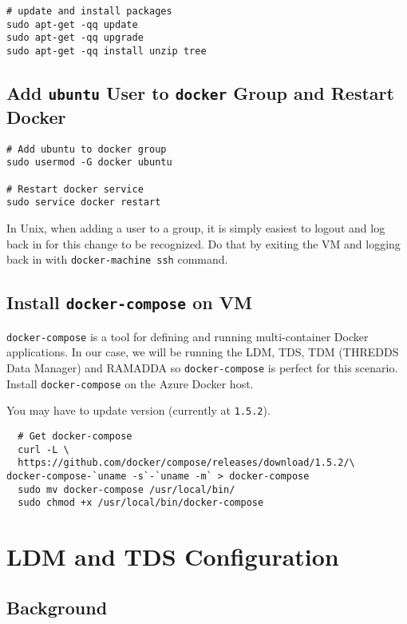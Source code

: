 \documentclass[onecolumn,9pt]{article}
\begin{document}
\begin{verbatim}
# update and install packages
sudo apt-get -qq update
sudo apt-get -qq upgrade
sudo apt-get -qq install unzip tree
\end{verbatim}

\subsection{\label{orgtarget6}Add \texttt{ubuntu} User to \texttt{docker} Group and Restart Docker}
\label{sec:orgheadline11}

\begin{verbatim}
# Add ubuntu to docker group
sudo usermod -G docker ubuntu

# Restart docker service
sudo service docker restart
\end{verbatim}


In Unix, when adding a user to a group, it is simply easiest to logout and log back in for this change to be recognized. Do that by exiting the VM and logging back in with \texttt{docker-machine ssh} command.

\subsection{Install \texttt{docker-compose} on VM}
\label{sec:orgheadline12}

\texttt{docker-compose} is a tool for defining and running multi-container Docker applications. In our case, we will be running the LDM, TDS, TDM (THREDDS Data Manager) and RAMADDA so \texttt{docker-compose} is perfect for this scenario. Install \texttt{docker-compose} on the Azure Docker host.

You may have to update version (currently at \texttt{1.5.2}).

\begin{verbatim}
  # Get docker-compose
  curl -L \
  https://github.com/docker/compose/releases/download/1.5.2/\
docker-compose-`uname -s`-`uname -m` > docker-compose
  sudo mv docker-compose /usr/local/bin/
  sudo chmod +x /usr/local/bin/docker-compose
\end{verbatim}

\section{LDM and TDS Configuration}
\label{sec:orgheadline29}
\subsection{Background}
\label{sec:orgheadline16}
\end{document}
